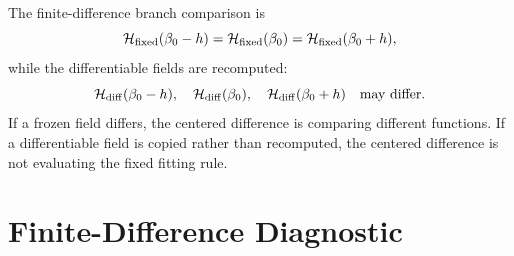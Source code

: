 \documentclass[11pt]{article}
\numberwithin{equation}{section}
\begin{document}
The finite-difference branch comparison is
\begin{equation}
    \mathcal H_{\rm fixed}(\beta_0-h)
    =
    \mathcal H_{\rm fixed}(\beta_0)
    =
    \mathcal H_{\rm fixed}(\beta_0+h),
    \label{eq:p24-p23-man6}
\end{equation}
while the differentiable fields are recomputed:
\begin{equation}
    \mathcal H_{\rm diff}(\beta_0-h),
    \quad
    \mathcal H_{\rm diff}(\beta_0),
    \quad
    \mathcal H_{\rm diff}(\beta_0+h)
    \quad
    \text{may differ.}
    \label{eq:p24-p23-man7}
\end{equation}
If a frozen field differs, the centered difference is comparing different
functions.  If a differentiable field is copied rather than recomputed, the
centered difference is not evaluating the fixed fitting rule.

\section{Finite-Difference Diagnostic}
\end{document}
